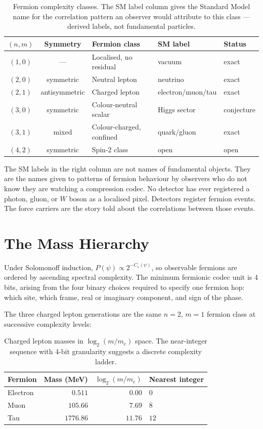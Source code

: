 \begin{table}[h]
\centering
\begin{tabular}{cclll}
\toprule
$(n,m)$ & Symmetry & Fermion class & SM label & Status \\
\midrule
$(1,0)$ & --- & Localised, no residual & vacuum & exact \\
$(2,0)$ & symmetric & Neutral lepton & neutrino & exact \\
$(2,1)$ & antisymmetric & Charged lepton & electron/muon/tau & exact \\
$(3,0)$ & symmetric & Colour-neutral scalar & Higgs sector & conjecture \\
$(3,1)$ & mixed & Colour-charged, confined & quark/gluon & exact \\
$(4,2)$ & symmetric & Spin-2 class & open & open \\
\bottomrule
\end{tabular}
\caption{Fermion complexity classes. The SM label column gives the
Standard Model name for the correlation pattern an observer would
attribute to this class --- derived labels, not fundamental particles.}
\end{table}

The SM labels in the right column are not names of fundamental
objects. They are the names given to patterns of fermion behaviour by
observers who do not know they are watching a compression codec. No
detector has ever registered a photon, gluon, or $W$ boson as a
localised pixel. Detectors register fermion events. The force carriers
are the story told about the correlations between those events.

\section{The Mass Hierarchy}

Under Solomonoff induction, $P(\psi) \propto 2^{-C_s(\psi)}$, so
observable fermions are ordered by ascending spectral complexity.
The minimum fermionic codec unit is 4 bits, arising from the four
binary choices required to specify one fermion hop: which site, which
frame, real or imaginary component, and sign of the phase.

The three charged lepton generations are the same $n = 2$, $m = 1$
fermion class at successive complexity levels:

\begin{table}[h]
\centering
\begin{tabular}{lrrl}
\toprule
Fermion & Mass (MeV) & $\log_2(m/m_e)$ & Nearest integer \\
\midrule
Electron & $0.511$    & $0.00$  & $0$ \\
Muon     & $105.66$   & $7.69$  & $8$ \\
Tau      & $1776.86$  & $11.76$ & $12$ \\
\bottomrule
\end{tabular}
\caption{Charged lepton masses in $\log_2(m/m_e)$ space. The
near-integer sequence with 4-bit granularity suggests a discrete
complexity ladder.}
\end{table}

